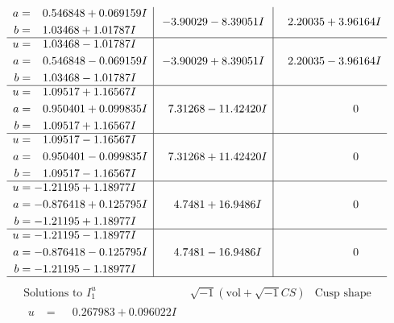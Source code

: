 \documentclass[1p]{elsarticle_modified}
\theoremstyle{definition}
\newcommand{\I}{\sqrt{-1}}
\begin{document}
$$\begin{array}{c|c|c}
\begin{aligned}
a &= \phantom{-}0.546848 + 0.069159 I \\
b &= \phantom{-}1.03468 + 1.01787 I\end{aligned}
 & -3.90029 - 8.39051 I & \phantom{-}2.20035 + 3.96164 I \\ \hline\begin{aligned}
u &= \phantom{-}1.03468 - 1.01787 I \\
a &= \phantom{-}0.546848 - 0.069159 I \\
b &= \phantom{-}1.03468 - 1.01787 I\end{aligned}
 & -3.90029 + 8.39051 I & \phantom{-}2.20035 - 3.96164 I \\ \hline\begin{aligned}
u &= \phantom{-}1.09517 + 1.16567 I \\
a &= \phantom{-}0.950401 + 0.099835 I \\
b &= \phantom{-}1.09517 + 1.16567 I\end{aligned}
 & \phantom{-}7.31268 - 11.42420 I & \phantom{-0.000000 } 0 \\ \hline\begin{aligned}
u &= \phantom{-}1.09517 - 1.16567 I \\
a &= \phantom{-}0.950401 - 0.099835 I \\
b &= \phantom{-}1.09517 - 1.16567 I\end{aligned}
 & \phantom{-}7.31268 + 11.42420 I & \phantom{-0.000000 } 0 \\ \hline\begin{aligned}
u &= -1.21195 + 1.18977 I \\
a &= -0.876418 + 0.125795 I \\
b &= -1.21195 + 1.18977 I\end{aligned}
 & \phantom{-}4.7481 + 16.9486 I & \phantom{-0.000000 } 0 \\ \hline\begin{aligned}
u &= -1.21195 - 1.18977 I \\
a &= -0.876418 - 0.125795 I \\
b &= -1.21195 - 1.18977 I\end{aligned}
 & \phantom{-}4.7481 - 16.9486 I & \phantom{-0.000000 } 0\\
 \hline 
 \end{array}$$\newpage$$\begin{array}{c|c|c}  
\text{Solutions to }I^u_{1}& \I (\text{vol} + \sqrt{-1}CS) & \text{Cusp shape}\\
 \hline 
\begin{aligned}
u &= \phantom{-}0.267983 + 0.096022 I \\

\end{aligned}
\end{array}$$
\end{document}
